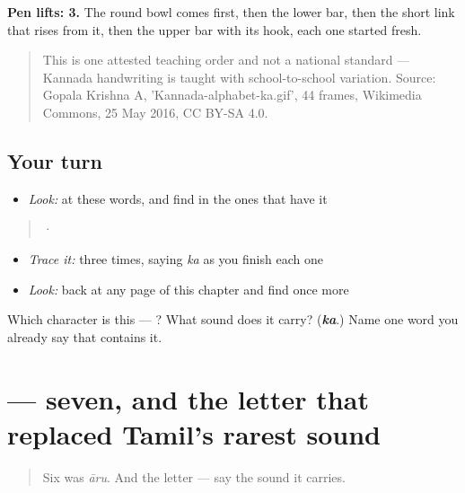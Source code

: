 \textbf{Pen lifts: 3.} The round bowl comes first, then the lower bar, then the short link that rises from it, then the upper bar with its hook, each one started fresh.

\begin{quote}
This is one attested teaching order and not a national standard — Kannada handwriting is taught with school-to-school variation. Source: Gopala Krishna A, 'Kannada-alphabet-ka.gif', 44 frames, Wikimedia Commons, 25 May 2016, CC BY-SA 4.0.
\end{quote}

\subsection*{Your turn}
\begin{itemize}
\raggedright
  \item \emph{Look:} at these words, and find  in the ones that have it
\end{itemize}

\begin{quote}
  ·  
\end{quote}

\begin{itemize}
\raggedright
  \item \emph{Trace it:}  three times, saying \emph{ka} as you finish each one
  \item \emph{Look:} back at any page of this chapter and find  once more
\end{itemize}

\begin{tcolorbox}[breakable,colback=teal!4,colframe=teal!35!black,title={Before you move on}]
Which character is this — ? What sound does it carry? (\emph{\textbf{ka}}.) Name one word you already say that contains it.
\end{tcolorbox}
\section[\texorpdfstring{\kn{ಏಳು} (ēḷu)}{ಏಳು (ēḷu)}]{ — seven, and the letter that replaced Tamil's rarest sound}

\label{lesson:KA-C07-eelu}



\begin{quote}
Six was \emph{āru}. And the letter \textbf{} — say the sound it carries.
\end{quote}

